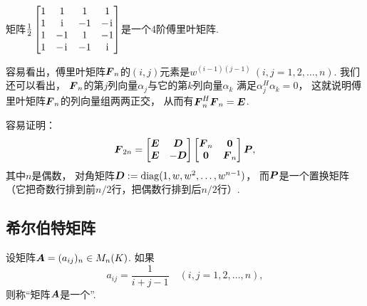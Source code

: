 \begin{example}
矩阵\(
	\frac12
	\begin{bmatrix}
		1 & 1 & 1 & 1 \\
		1 & \kern1pt\mathrm{i}\kern1pt & -1 & -\kern1pt\mathrm{i}\kern1pt \\
		1 & -1 & 1 & -1 \\
		1 & -\kern1pt\mathrm{i}\kern1pt & -1 & \kern1pt\mathrm{i}\kern1pt
	\end{bmatrix}
\)是一个4阶傅里叶矩阵.
\end{example}

容易看出，傅里叶矩阵\(\boldsymbol{F}_n\)的\((i,j)\)元素是\(
	w^{(i-1)(j-1)}
	\ (i,j=1,2,\dotsc,n)
\).
我们还可以看出，
\(\boldsymbol{F}_n\)的第\(j\)列向量\(\alpha_j\)与它的第\(k\)列向量\(\alpha_k\)
满足\(\alpha_j^H \alpha_k = 0\)，
这就说明傅里叶矩阵\(\boldsymbol{F}_n\)的列向量组两两正交，
从而有\(\boldsymbol{F}_n^H \boldsymbol{F}_n = \boldsymbol{E}\).

容易证明：\begin{equation*}
	\boldsymbol{F}_{2n}
	= \begin{bmatrix}
		\boldsymbol{E} & \boldsymbol{D} \\
		\boldsymbol{E} & -\boldsymbol{D}
	\end{bmatrix}
	\begin{bmatrix}
		\boldsymbol{F}_n & \boldsymbol0 \\
		\boldsymbol0 & \boldsymbol{F}_n
	\end{bmatrix}
	\boldsymbol{P},
\end{equation*}
其中\(n\)是偶数，
对角矩阵\(
	\boldsymbol{D} := \operatorname{diag}(1,w,w^2,\dotsc,w^{n-1})
\)，
而\(\boldsymbol{P}\)是一个置换矩阵
（它把奇数行排到前\(n/2\)行，把偶数行排到后\(n/2\)行）.

\subsection{希尔伯特矩阵}
\begin{definition}
设矩阵\(\boldsymbol{A}=(a_{ij})_n \in M_n(K)\).
如果\begin{equation*}
	a_{ij} = \frac{1}{i + j - 1}
	\quad(i,j=1,2,\dotsc,n),
\end{equation*}
则称“矩阵\(\boldsymbol{A}\)是一个”.
\end{definition}
